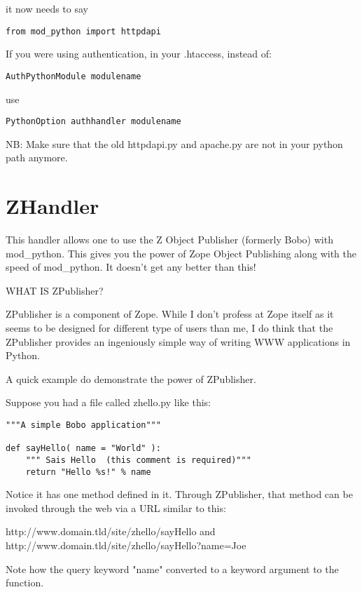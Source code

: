 it now needs to say

\begin{verbatim}
from mod_python import httpdapi
\end{verbatim}    

If you were using authentication, in your .htaccess, instead of:

\begin{verbatim}
AuthPythonModule modulename
\end{verbatim}    

use
\begin{verbatim}
PythonOption authhandler modulename
\end{verbatim}    

NB: Make sure that the old httpdapi.py and apache.py are not in your
python path anymore.

\section{ZHandler\label{hand-z}}

This handler allows one to use the Z Object Publisher (formerly Bobo)
with mod_python. This gives you the power of Zope Object Publishing
along with the speed of mod_python. It doesn't get any better than
this!

WHAT IS ZPublisher?

ZPublisher is a component of Zope. While I don't profess at Zope
itself as it seems to be designed for different type of users than me,
I do think that the ZPublisher provides an ingeniously simple way of
writing WWW applications in Python.

A quick example do demonstrate the power of ZPublisher.

Suppose you had a file called zhello.py like this:

\begin{verbatim}
"""A simple Bobo application"""

def sayHello( name = "World" ):
    """ Sais Hello  (this comment is required)"""
    return "Hello %s!" % name
\end{verbatim}

Notice it has one method defined in it. Through ZPublisher, that
method can be invoked through the web via a URL similar to this:

http://www.domain.tld/site/zhello/sayHello and \\
http://www.domain.tld/site/zhello/sayHello?name=Joe

Note how the query keyword "name" converted to a keyword argument to
the function.

